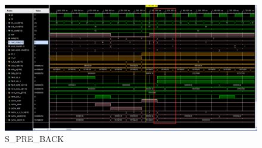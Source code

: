 \begin{figure}[H]
    \centering
    \includegraphics[width=1.0\textwidth]{figs/sres8.png}
    \caption{S\_PRE\_BACK}
    \label{Fig.11}
\end{figure}


